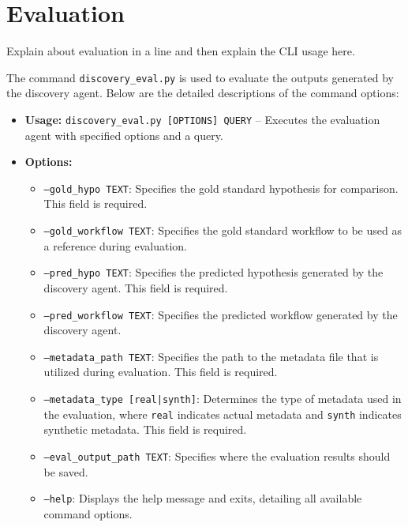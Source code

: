 \section{Evaluation}

Explain about evaluation in a line and then explain the CLI usage here. 

The command \texttt{discovery\_eval.py} is used to evaluate the outputs generated by the discovery agent. Below are the detailed descriptions of the command options:

\begin{itemize}[leftmargin=*]
    \item \textbf{Usage:} \texttt{discovery\_eval.py [OPTIONS] QUERY} -- Executes the evaluation agent with specified options and a query.

    \item \textbf{Options:}
    \begin{itemize}
        \item \texttt{--gold\_hypo TEXT}: Specifies the gold standard hypothesis for comparison. This field is required.
        
        \item \texttt{--gold\_workflow TEXT}: Specifies the gold standard workflow to be used as a reference during evaluation.
        
        \item \texttt{--pred\_hypo TEXT}: Specifies the predicted hypothesis generated by the discovery agent. This field is required.
        
        \item \texttt{--pred\_workflow TEXT}: Specifies the predicted workflow generated by the discovery agent.
        
        \item \texttt{--metadata\_path TEXT}: Specifies the path to the metadata file that is utilized during evaluation. This field is required.
        
        \item \texttt{--metadata\_type [real|synth]}: Determines the type of metadata used in the evaluation, where \texttt{real} indicates actual metadata and \texttt{synth} indicates synthetic metadata. This field is required.
        
        \item \texttt{--eval\_output\_path TEXT}: Specifies where the evaluation results should be saved.
        
        \item \texttt{--help}: Displays the help message and exits, detailing all available command options.
    \end{itemize}
\end{itemize}


